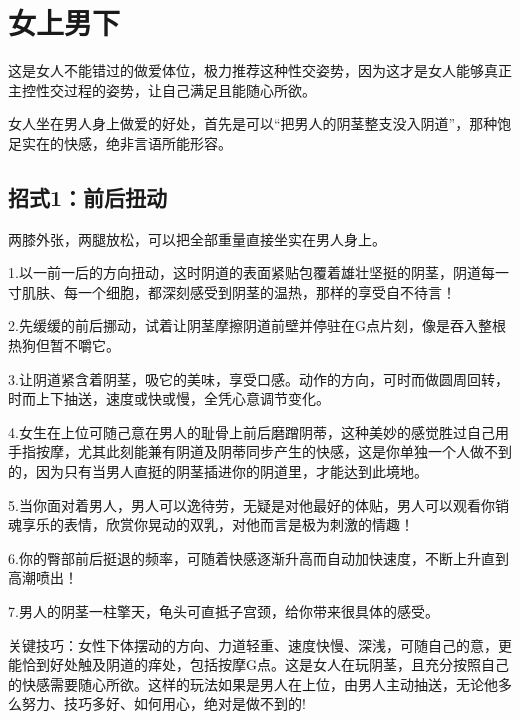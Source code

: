 \documentclass[12pt,UTF8]{ctexbook}
\begin{document}
\section{女上男下}

这是女人不能错过的做爱体位，极力推荐这种性交姿势，因为这才是女人能够真正主控性交过程的姿势，让自己满足且能随心所欲。

女人坐在男人身上做爱的好处，首先是可以“把男人的阴茎整支没入阴道”，那种饱足实在的快感，绝非言语所能形容。

\subsection{招式1：前后扭动}

两膝外张，两腿放松，可以把全部重量直接坐实在男人身上。

1.以一前一后的方向扭动，这时阴道的表面紧贴包覆着雄壮坚挺的阴茎，阴道每一寸肌肤、每一个细胞，都深刻感受到阴茎的温热，那样的享受自不待言！

2.先缓缓的前后挪动，试着让阴茎摩擦阴道前壁并停驻在G点片刻，像是吞入整根热狗但暂不嚼它。

3.让阴道紧含着阴茎，吸它的美味，享受口感。动作的方向，可时而做圆周回转，时而上下抽送，速度或快或慢，全凭心意调节变化。

4.女生在上位可随己意在男人的耻骨上前后磨蹭阴蒂，这种美妙的感觉胜过自己用手指按摩，尤其此刻能兼有阴道及阴蒂同步产生的快感，这是你单独一个人做不到的，因为只有当男人直挺的阴茎插进你的阴道里，才能达到此境地。

5.当你面对着男人，男人可以逸待劳，无疑是对他最好的体贴，男人可以观看你销魂享乐的表情，欣赏你晃动的双乳，对他而言是极为刺激的情趣！

6.你的臀部前后挺退的频率，可随着快感逐渐升高而自动加快速度，不断上升直到高潮喷出！

7.男人的阴茎一柱擎天，龟头可直抵子宫颈，给你带来很具体的感受。

关键技巧：女性下体摆动的方向、力道轻重、速度快慢、深浅，可随自己的意，更能恰到好处触及阴道的痒处，包括按摩G点。这是女人在玩阴茎，且充分按照自己的快感需要随心所欲。这样的玩法如果是男人在上位，由男人主动抽送，无论他多么努力、技巧多好、如何用心，绝对是做不到的!
\end{document}
